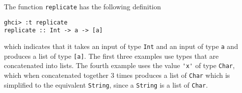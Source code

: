 
The function \verb|replicate| has the following definition
\scriptsize\begin{verbatim}
ghci> :t replicate
replicate :: Int -> a -> [a]
\end{verbatim}\normalsize
which indicates that it takes an input of type \verb|Int| and an input of type 
\verb|a| and produces a list of type \verb|[a]|. The first three examples use
types that are concatenated into lists. The fourth example uses the value
\verb|'x'| of type \verb|Char|, which when concatenated together 3 times produces
a list of \verb|Char| which is simplified to the equivalent \verb|String|, since
a \verb|String| is a list of \verb|Char|.
